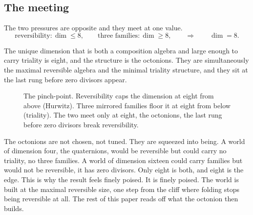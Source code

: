 \subsection{The meeting}

The two pressures are opposite and they meet at one value.
\begin{equation}
  \text{reversibility}\colon \dim \le 8, \qquad
  \text{three families}\colon \dim \ge 8, \qquad \Longrightarrow \qquad \dim = 8.
\end{equation}

\begin{result}
The unique dimension that is both a composition algebra and large enough to carry triality is eight, and the structure
is the octonions. They are simultaneously the maximal reversible algebra and the minimal triality structure, and they
sit at the last rung before zero divisors appear.
\end{result}

\begin{figure}[ht]
\centering
{}
\caption{The pinch-point. Reversibility caps the dimension at eight from above (Hurwitz). Three mirrored families
floor it at eight from below (triality). The two meet only at eight, the octonions, the last rung before zero
divisors break reversibility.}
\label{fig:pinch}
\end{figure}

The octonions are not chosen, not tuned. They are squeezed into being. A world of dimension four, the quaternions,
would be reversible but could carry no triality, no three families. A world of dimension sixteen could carry families
but would not be reversible, it has zero divisors. Only eight is both, and eight is the edge. This is why the result
feels finely poised. It is finely poised. The world is built at the maximal reversible size, one step from the cliff
where folding stops being reversible at all. The rest of this paper reads off what the octonion then builds.

